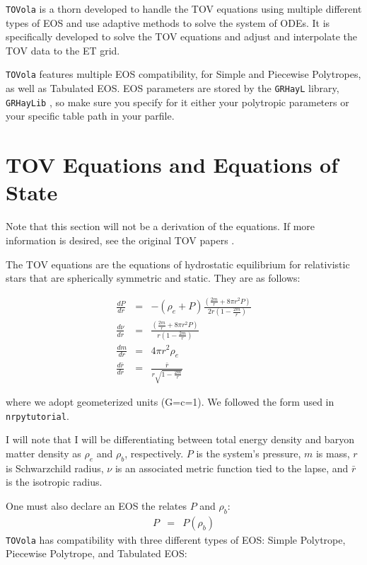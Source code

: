 \texttt{TOVola} is a thorn developed to handle the TOV equations using multiple different types of EOS and use adaptive methods to solve the system of ODEs. It is specifically developed to solve the TOV equations and adjust and interpolate the TOV data to the ET grid.

\texttt{TOVola} features multiple EOS compatibility, for Simple and Piecewise Polytropes, as well as Tabulated EOS. EOS parameters are stored by the \texttt{GRHayL} library, \texttt{GRHayLib} \cite{TOVola_TOVola_GRHayL}, so make sure you specify for it either your polytropic parameters or your specific table path in your parfile.

\section{TOV Equations and Equations of State}

Note that this section will not be a derivation of the equations. If more information is desired, see the original TOV papers \cite{TOVola_TOVola_Tolman, TOVola_TOVola_OppVol}.

The TOV equations are the equations of hydrostatic equilibrium for relativistic stars that are spherically symmetric and static. They are as follows:

\begin{eqnarray}
    \frac{dP}{dr} & = & -(\rho_e+P)\frac{(\frac{2m}{r}+8\pi r^2P)}{2r(1-\frac{2m}{r})} \\
    \frac{d\nu}{dr} & = & \frac{(\frac{2m}{r}+8\pi r^2P)}{r(1-\frac{2m}{r})} \\
    \frac{dm}{dr} & = & 4\pi r^2 \rho_e \\
    \frac{d\bar{r}}{dr} & = & \frac{\bar{r}}{r\sqrt{1-\frac{2m}{r}}}
\end{eqnarray}

where we adopt geometerized units (G=c=1). We followed the form used in \texttt{nrpytutorial}.\cite{TOVola_TOVola_NRpy}

I will note that I will be differentiating between total energy density and baryon matter density as $\rho_e$ and $\rho_b$, respectively. $P$ is the system's pressure, $m$ is mass, $r$ is Schwarzchild radius, $\nu$ is an associated metric function tied to the lapse, and $\bar{r}$ is the isotropic radius.

One must also declare an EOS the relates $P$ and $\rho_b$:
\begin{eqnarray}
    P & = & P(\rho_b)
\end{eqnarray}
\texttt{TOVola} has compatibility with three different types of EOS: Simple Polytrope, Piecewise Polytrope, and Tabulated EOS:

